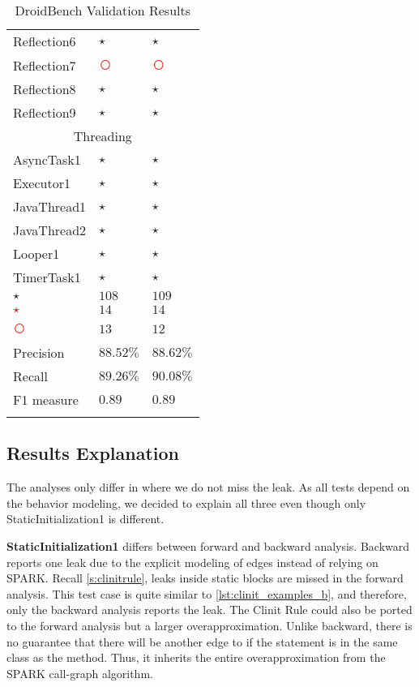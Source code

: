 \documentclass[../draft.tex]{subfiles}
\newcommand{\fp}{{\fontfamily{cmr}\selectfont\textcolor{white}{\textcircled{\textcolor{red}{$\star$}}}}}
\newcommand{\fn}{{\fontfamily{cmr}\selectfont\textcolor{red}{\textcircled{ }}}}
\newcommand{\tp}[0]{{\fontfamily{cmr}\selectfont\textcircled{$\star$}}}
\newcommand{\tsub}[1]{\multicolumn{3}{c}{#1}\\\hline}
\begin{document}
\begin{longtable}{l | l | l}
        Reflection6 & \tp & \tp\\
        Reflection7 & \fn & \fn\\
        Reflection8 & \tp & \tp\\
        Reflection9 & \tp & \tp\\
        \hline
        \tsub{Threading}
        AsyncTask1 & \tp & \tp\\
        Executor1 & \tp & \tp\\
        JavaThread1 & \tp & \tp\\
        JavaThread2 & \tp & \tp\\
        Looper1 & \tp & \tp\\
        TimerTask1 & \tp & \tp\\
        \hhline  %
        \tp &$ 108 $&$ 109 $\\
        \fp &$ 14 $&$ 14 $\\
        \fn &$ 13 $&$ 12 $\\
        Precision & $ 88.52 \%$ & $ 88.62 \%$\\
        Recall & $ 89.26 \% $ & $ 90.08 \%$\\
        F1 measure & $ 0.89 $ & $ 0.89 $\\
        \caption{DroidBench Validation Results}
        \label{t:droidbenchvalidation}
    \end{longtable}

    \subsection{Results Explanation}
    The analyses only differ in  where we do not miss the leak.
    As all  tests depend on the  behavior modeling, we decided to explain all three even though only StaticInitialization1 is different.

    \textbf{StaticInitialization1} differs between forward and backward analysis.
    Backward reports one leak due to the explicit modeling of  edges instead of relying on SPARK.
    Recall \autoref{s:clinitrule}, leaks inside static blocks are missed in the forward analysis.
    This test case is quite similar to \autoref{lst:clinit_examples_b}, and therefore, only the backward analysis reports the leak.
    The Clinit Rule could also be ported to the forward analysis but a larger overapproximation.
    Unlike backward, there is no guarantee that there will be another edge to  if the statement is in the same class as the  method.
    Thus, it inherits the entire overapproximation from the SPARK call-graph algorithm.
\end{document}
